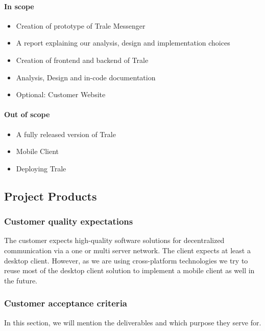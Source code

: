 \paragraph{In scope}
\begin{itemize}
    \setlength\itemsep{-0.5em}
    \item Creation of prototype of Trale Messenger
    \item A report explaining our analysis, design and implementation choices
    \item Creation of frontend and backend of Trale
    \item Analysis, Design and in-code documentation
    \item Optional: Customer Website
\end{itemize}

\paragraph{Out of scope}
\begin{itemize}
    \setlength\itemsep{-0.5em}
    \item A fully released version of Trale
    \item Mobile Client
    \item Deploying Trale
\end{itemize}

\subsection{Project Products}\label{subsec:project-products}

\subsubsection{Customer quality expectations}

The customer expects high-quality software solutions for decentralized communication via a one or multi server network.
The client expects at least a desktop client.
However, as we are using cross-platform technologies we try to reuse most of the desktop client solution to implement
a mobile client as well in the future.

\subsubsection{Customer acceptance criteria}

In this section, we will mention the deliverables and which purpose they serve for.

